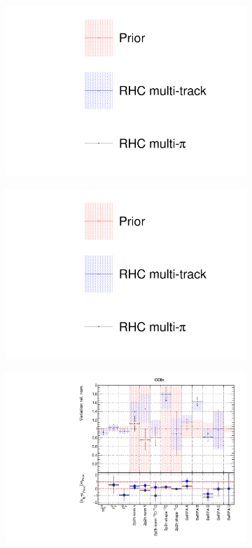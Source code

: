 \begin{figure}[t]
\centering
\begin{subfigure}{0.3\textwidth}
  \centering
  \includegraphics[width=1.0\linewidth, trim={5mm  130mm 0mm 10mm}, clip]{figs/rhcmpdat248_leg}	
\end{subfigure}
\begin{subfigure}{0.3\textwidth}
  \centering
  \includegraphics[width=1.0\linewidth, trim={5mm  0mm 0mm 70mm}, clip]{figs/rhcmpdat248_leg}	
\end{subfigure}
\begin{subfigure}{0.49\textwidth}
  \centering
  \includegraphics[width=0.95\linewidth]{figs/rhcmpdatxsec28_1}

\end{subfigure}
\end{figure}
